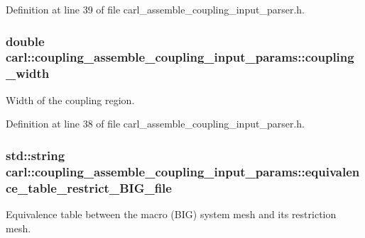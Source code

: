 Definition at line 39 of file carl\+\_\+assemble\+\_\+coupling\+\_\+input\+\_\+parser.\+h.

\hypertarget{structcarl_1_1coupling__assemble__coupling__input__params_a2cfb03a4663c3c6bc494a88084000249}{}
\subsubsection[{coupling\+\_\+width}]{\setlength{\rightskip}{0pt plus 5cm}double carl\+::coupling\+\_\+assemble\+\_\+coupling\+\_\+input\+\_\+params\+::coupling\+\_\+width}\label{structcarl_1_1coupling__assemble__coupling__input__params_a2cfb03a4663c3c6bc494a88084000249}


Width of the coupling region. 



Definition at line 38 of file carl\+\_\+assemble\+\_\+coupling\+\_\+input\+\_\+parser.\+h.

\hypertarget{structcarl_1_1coupling__assemble__coupling__input__params_a38e203a052eb26245cc22e80084464dd}{}
\subsubsection[{equivalence\+\_\+table\+\_\+restrict\+\_\+\+B\+I\+G\+\_\+file}]{\setlength{\rightskip}{0pt plus 5cm}std\+::string carl\+::coupling\+\_\+assemble\+\_\+coupling\+\_\+input\+\_\+params\+::equivalence\+\_\+table\+\_\+restrict\+\_\+\+B\+I\+G\+\_\+file}\label{structcarl_1_1coupling__assemble__coupling__input__params_a38e203a052eb26245cc22e80084464dd}


Equivalence table between the macro (B\+I\+G) system mesh and its restriction mesh. 



